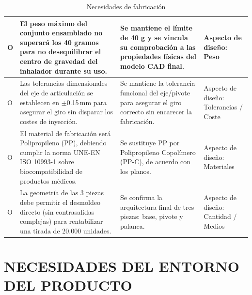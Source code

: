 \documentclass[11pt,a4paper]{article}
\begin{document}
\begin{table}[H]
\begin{tabular}{|p{2.8cm}|p{5.5cm}|p{2.5cm}|p{3.0cm}|}
\hline
O & El peso máximo del conjunto ensamblado no superará los 40 gramos para no desequilibrar el centro de gravedad del inhalador durante su uso. & Se mantiene el límite de 40 g y se vincula su comprobación a las propiedades físicas del modelo CAD final. & Aspecto de diseño: Peso \\
\hline
O & Las tolerancias dimensionales del eje de articulación se establecen en $\pm$0.15\,mm para asegurar el giro sin disparar los costes de inyección. & Se mantiene la tolerancia funcional del eje/pivote para asegurar el giro correcto sin encarecer la fabricación. & Aspecto de diseño: Tolerancias / Coste \\
\hline
O & El material de fabricación será Polipropileno (PP), debiendo cumplir la norma UNE-EN ISO 10993-1 sobre biocompatibilidad de productos médicos. & Se sustituye PP por Polipropileno Copolímero (PP-C), de acuerdo con los planos. & Aspecto de diseño: Materiales \\
\hline
O & La geometría de las 3 piezas debe permitir el desmoldeo directo (sin contrasalidas complejas) para rentabilizar una tirada de 20.000 unidades. & Se confirma la arquitectura final de tres piezas: base, pivote y palanca. & Aspecto de diseño: Cantidad / Medios \\
\hline
\end{tabular}
\caption{Necesidades de fabricación}
\end{table}

\newpage

\section{NECESIDADES DEL ENTORNO DEL PRODUCTO}

\vspace{0.5cm}
\end{document}
